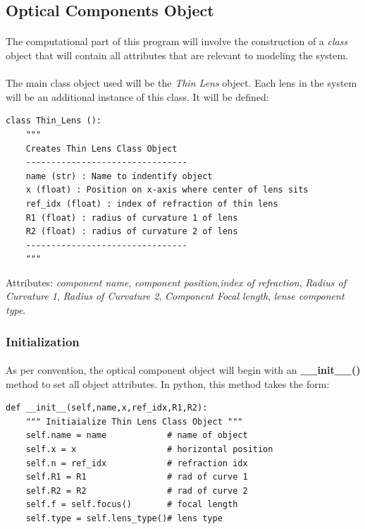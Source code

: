 \documentclass[12pt,letterpaper]{article}
\begin{document}

\subsection{Optical Components Object}
\paragraph*{}The computational part of this program will involve the construction of a \textit{class} object that will contain all attributes that are relevant to modeling the system.
\paragraph*{}The main class object used will be the \textit{Thin Lens} object. Each lens in the system will be an additional instance of this class. It will be defined:
\begin{verbatim}
class Thin_Lens ():
    """
    Creates Thin Lens Class Object
    --------------------------------
    name (str) : Name to indentify object
    x (float) : Position on x-axis where center of lens sits
    ref_idx (float) : index of refraction of thin lens
    R1 (float) : radius of curvature 1 of lens
    R2 (float) : radius of curvature 2 of lens
    --------------------------------
    """
\end{verbatim}
Attributes: \textit{component name}, \textit{component position},\textit{index of refraction}, \textit{Radius of Curvature 1}, \textit{Radius of Curvature 2}, \textit{Component Focal length}, \textit{lense component type}.
\subsubsection*{Initialization}
\paragraph*{}As per convention, the optical component object will begin with an \textbf{\_\_init\_\_()} method to set all object attributes. In python, this method takes the form:
\begin{verbatim}
def __init__(self,name,x,ref_idx,R1,R2):
    """ Initiaialize Thin Lens Class Object """
    self.name = name            # name of object
    self.x = x                  # horizontal position
    self.n = ref_idx            # refraction idx
    self.R1 = R1                # rad of curve 1
    self.R2 = R2                # rad of curve 2
    self.f = self.focus()       # focal length
    self.type = self.lens_type()# lens type
\end{verbatim}
\end{document}
